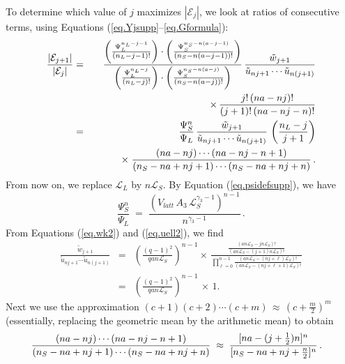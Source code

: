 \documentclass[journal=mamobx,manuscript=article]{achemso}
\newcommand{\leng}{\mathcal{L}}
\begin{document}
To determine which value of $j$ maximizes $|\mathcal{E}_j|$, we look at ratios of consecutive terms, using Equations (\ref{eq.Yjsupp}--\ref{eq.Gformula}):
\begin{eqnarray}
    \frac{|\mathcal{E}_{j+1}|}{|\mathcal{E}_j|}   & = & 
 \frac{
     \left(\frac{\Psi_L^{n_{L}-j-1}}{(n_L-j-1)!}\right)\cdot\left(\frac{\Psi_S^{n_S-n(a-j-1)}}{
    (n_S-n(a-j-1))!}\right) 
      }{
 \left(\frac{\Psi_L^{n_{L}-j}}{(n_L-j)!}\right)\cdot\left(\frac{\Psi_S^{n_S-n(a-j)}}{
    (n_S-n(a-j))!}\right)  }  \,   \frac{\tilde{w}_{j+1} }{  \tilde{u}_{nj+1}\cdots \tilde{u}_{n(j+1)} } 
    \nonumber \\
    & & \hspace{42mm}  
     \times   \, \frac{ j! \, (na-nj)!}{(j+1)!\, (na-nj-n)!}  
    \nonumber    \\
    & = & \frac{\Psi_S^n}{\Psi_L}
    \,   \frac{\tilde{w}_{j+1} }{  \tilde{u}_{nj+1}\cdots \tilde{u}_{n(j+1)} }   \,\left(  \frac{n_L-j}{j+1}\right)
    \nonumber \\
    & &   \hspace{8mm}  \times \;  \frac{(na-nj)\cdots (na-nj-n+1)}{(n_S-na+nj+1)\cdots(n_S-na+nj+n)} \,.
        \label{eq.Yratio1}
\end{eqnarray}
From now on, we replace $\leng_L$ by $n\leng_S$.
By Equation (\ref{eq.psidefsupp}), we have
\begin{equation}
   \label{eq.psiratio} 
      \frac{\Psi_S^n}{\Psi_L}   \;=\;   \frac{ (V_{latt}\, A_3 \,\leng_S^{\gamma_3-1})^{n-1}}{n^{\gamma_3-1}}\,.
\end{equation}
From Equations (\ref{eq.wk2}) and (\ref{eq.uell2}), we find
\begin{eqnarray}
     \frac{\tilde{w}_{j+1} }{  \tilde{u}_{nj+1}\cdots \tilde{u}_{n(j+1)} }  & = & 
        \left( \frac{(q-1)^2}{qan\leng_S}\right)^{n-1}   \times \,
    \frac{   \frac{(an\leng_S-jn\leng_S)!}{(an\leng_S-(j+1)n\leng_S)!}  }{
        \prod_{\ell=0}^{n-1} \frac{ (an\leng_S-(nj+\ell)\leng_S)!}{(an\leng_S-(nj+\ell+1)\leng_S)!}   }
     \nonumber  \\
     & = & \left( \frac{(q-1)^2}{qan\leng_S}\right)^{n-1}  \,\times\, 1.
     \label{eq.Yratioa}     
\end{eqnarray}
Next we use the approximation   $(c+1)(c+2)\cdots (c+m) \,\approx \,(c+\frac{m}{2})^m$
(essentially, replacing the geometric mean by the arithmetic mean) to obtain
\begin{equation}
       \frac{(na-nj)\cdots (na-nj-n+1)}{(n_S-na+nj+1)\cdots(n_S-na+nj+n)} 
       \; \approx \;    \frac{ [na-(j+\frac{1}{2})n]^n }{ [n_S-na+nj+\frac{n}{2}]^n} \,.\hspace{3mm}
      \label{eq.Yratiob}
\end{equation} 
\end{document}
